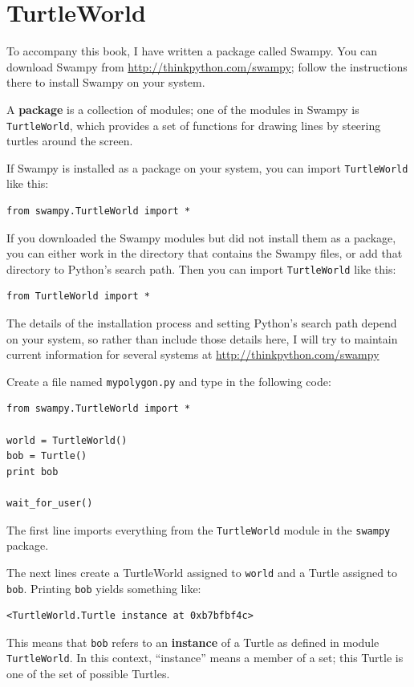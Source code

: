 \documentclass[10pt]{book}
\begin{document}
\section{TurtleWorld}
\label{turtleworld}

To accompany this book, I have written a package called Swampy.
You can download Swampy from \url{http://thinkpython.com/swampy};
follow the instructions there to install Swampy on your system.

A {\bf package} is a collection of modules; one of the modules in
Swampy is {\tt TurtleWorld}, which provides a set of functions for
drawing lines by steering turtles around the screen.

If Swampy is installed as a package on your system, you can import
{\tt TurtleWorld} like this:

\begin{verbatim}
from swampy.TurtleWorld import *
\end{verbatim}

If you downloaded the Swampy modules but did not install them as a
package, you can either work in the directory that contains the Swampy
files, or add that directory to Python's search path.  Then you can import
{\tt TurtleWorld} like this:

\begin{verbatim}
from TurtleWorld import *
\end{verbatim}

The details of the installation process and setting Python's search
path depend on your system, so rather than include those details here,
I will try to maintain current information for several systems
at \url{http://thinkpython.com/swampy}

Create a file named {\tt mypolygon.py} and type in the following
code:

\begin{verbatim}
from swampy.TurtleWorld import *

world = TurtleWorld()
bob = Turtle()
print bob

wait_for_user()
\end{verbatim}
%
The first line imports everything from the {\tt TurtleWorld} module
in the {\tt swampy} package.

The next lines create a TurtleWorld assigned to {\tt world} and
a Turtle assigned to {\tt bob}.  Printing {\tt bob} yields something
like:

\begin{verbatim}
<TurtleWorld.Turtle instance at 0xb7bfbf4c>
\end{verbatim}
%
This means that {\tt bob} refers to
an {\bf instance} of a Turtle
as defined in module {\tt TurtleWorld}.  In this context,
``instance'' means a member of a set;
this Turtle is one of the set of possible Turtles.
\end{document}
